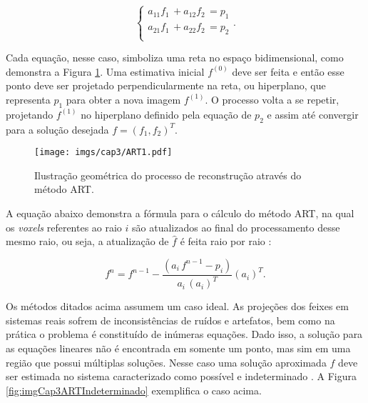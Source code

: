 {{\begin{equation}
\begin{cases}
a_{11}f_{1} \, + a_{12}f_{2} \, = p_{1} \\ 
a_{21}f_{1} \, + a_{22}f_{2} \, = p_{2} \\  
\end{cases}.
\label{eq:eqCap3ARTEquacoesLineares}
\end{equation}

Cada equação, nesse caso, simboliza uma reta no espaço bidimensional, como demonstra a Figura \ref{fig:imgCap3ART}. Uma estimativa inicial $f^{(0)}$ deve ser feita e então esse ponto deve ser projetado perpendicularmente na reta, ou hiperplano, que representa $p_{1}$ para obter a nova imagem $f^{(1)}$. O processo volta a se repetir, projetando $f^{(1)}$ no hiperplano definido pela equação de $p_{2}$ e assim até convergir para a solução desejada $f = (f_{1},f_{2})^{T}$.


\begin{figure}[h]
	\caption{Ilustração geométrica do processo de reconstrução através do método \acs{ART}.}
	\begin{center}
		\texttt{[image: imgs/cap3/ART1.pdf]}
	\end{center}
	\label{fig:imgCap3ART}
\end{figure} 

A equação abaixo demonstra a fórmula para o cálculo do método \acs{ART}, na qual os \textit{voxels} referentes ao raio $i$ são atualizados ao final do processamento desse mesmo raio, ou seja, a atualização de $\hat{f}$ é feita raio por raio \cite{buzug2008computed, levakhina2014three}:


\begin{equation}
f^{n} = f^{n-1} - \dfrac{(a_{i} \, f^{n-1}- p_{i})}{a_{i}\,(a_{i})^{T}}   (a_{i})^{T}   .  
\label{eq:eqCap3ARTEquacao}
\end{equation}


Os métodos ditados acima assumem um caso ideal. As projeções dos feixes em sistemas reais sofrem de inconsistências de ruídos e artefatos, bem como na prática o problema é constituído de inúmeras equações. Dado isso, a solução para as equações lineares não é encontrada em somente um ponto, mas sim em uma região que possui múltiplas soluções. Nesse caso uma solução aproximada $\hat{f}$ deve ser estimada no sistema caracterizado como possível e indeterminado \cite[p. 218]{buzug2008computed}. A Figura \ref{fig:imgCap3ARTIndeterminado} exemplifica o caso acima. 

}}
